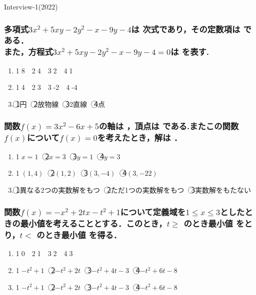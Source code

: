 \documentclass[onecolumn,10pt]{jarticle}
\newcommand{\ctext}[1]{\textcircled{\scriptsize #1}}
\begin{document}
\begin{flushright}
    Interview-1(2022)
\end{flushright}

\subsubsection{多項式$3x^2+5xy-2y^2-x-9y-4$は  次式であり，その定数項は  である．\\
また，方程式$3x^2+5xy-2y^2-x-9y-4=0$は  を表す.}
\begin{enumerate}[(1)]
    \item \ctext{1}8　\ctext{2}4　\ctext{3}2　\ctext{4}1
    \item \ctext{1}4　\ctext{2}3　\ctext{3}-2　\ctext{4}-4
    \item \ctext{1}円　\ctext{2}放物線　\ctext{3}2直線　\ctext{4}点
\end{enumerate}

\subsubsection{関数$f(x)=3x^2-6x+5$の軸は  ，頂点は  である.またこの関数$f(x)$について$f(x)=0$を考えたとき，解は  ．}
\begin{enumerate}[(1)]
    \item \ctext{1}$x=1$　\ctext{2}$x=3$　\ctext{3}$y=1$　\ctext{4}$y=3$
    \item \ctext{1}$(1,4)$　\ctext{2}$(1,2)$　\ctext{3}$(3,-4)$　\ctext{4}$(3,-22)$
    \item \ctext{1}異なる2つの実数解をもつ　\ctext{2}ただ1つの実数解をもつ　\ctext{3}実数解をもたない
\end{enumerate}

\subsubsection{関数$f(x)=-x^2+2tx-t^2+1$について定義域を$1\leq x\leq3$としたときの最小値を考えることとする．このとき，$t\geq$  のとき最小値  をとり，$t<$  のとき最小値  を得る．}
\begin{enumerate}[(1)]
    \item \ctext{1}0　\ctext{2}1　\ctext{3}2　\ctext{4}3
    \item \ctext{1}$-t^2+1$　\ctext{2}$-t^2+2t$　\ctext{3}$-t^2+4t-3$　\ctext{4}$-t^2+6t-8$
    \item \ctext{1}$-t^2+1$　\ctext{2}$-t^2+2t$　\ctext{3}$-t^2+4t-3$　\ctext{4}$-t^2+6t-8$
\end{enumerate}
\end{document}
